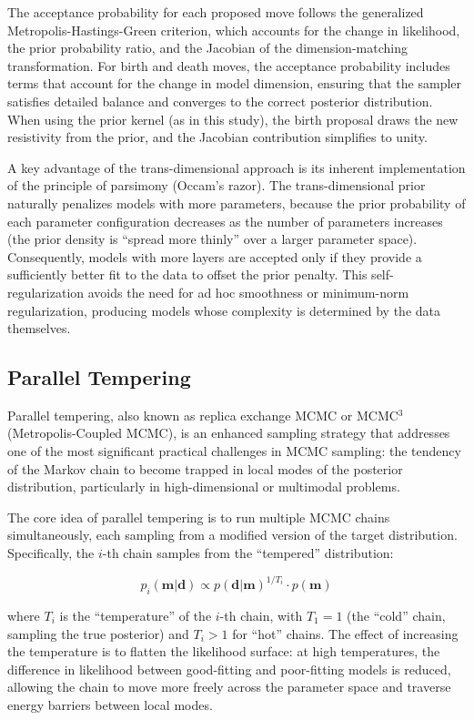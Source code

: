 The acceptance probability for each proposed move follows the generalized Metropolis-Hastings-Green criterion, which accounts for the change in likelihood, the prior probability ratio, and the Jacobian of the dimension-matching transformation. For birth and death moves, the acceptance probability includes terms that account for the change in model dimension, ensuring that the sampler satisfies detailed balance and converges to the correct posterior distribution. When using the prior kernel (as in this study), the birth proposal draws the new resistivity from the prior, and the Jacobian contribution simplifies to unity.

A key advantage of the trans-dimensional approach is its inherent implementation of the principle of parsimony (Occam's razor). The trans-dimensional prior naturally penalizes models with more parameters, because the prior probability of each parameter configuration decreases as the number of parameters increases (the prior density is ``spread more thinly'' over a larger parameter space). Consequently, models with more layers are accepted only if they provide a sufficiently better fit to the data to offset the prior penalty. This self-regularization avoids the need for ad hoc smoothness or minimum-norm regularization, producing models whose complexity is determined by the data themselves.

\subsection{Parallel Tempering}

Parallel tempering, also known as replica exchange MCMC or MCMC$^3$ (Metropolis-Coupled MCMC), is an enhanced sampling strategy that addresses one of the most significant practical challenges in MCMC sampling: the tendency of the Markov chain to become trapped in local modes of the posterior distribution, particularly in high-dimensional or multimodal problems.

The core idea of parallel tempering is to run multiple MCMC chains simultaneously, each sampling from a modified version of the target distribution. Specifically, the $i$-th chain samples from the ``tempered'' distribution:

\begin{equation}
p_i(\mathbf{m} | \mathbf{d}) \propto p(\mathbf{d} | \mathbf{m})^{1/T_i} \cdot p(\mathbf{m})
\end{equation}

\noindent where $T_i$ is the ``temperature'' of the $i$-th chain, with $T_1 = 1$ (the ``cold'' chain, sampling the true posterior) and $T_i > 1$ for ``hot'' chains. The effect of increasing the temperature is to flatten the likelihood surface: at high temperatures, the difference in likelihood between good-fitting and poor-fitting models is reduced, allowing the chain to move more freely across the parameter space and traverse energy barriers between local modes.

